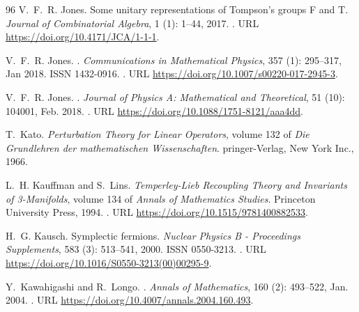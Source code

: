 \documentclass[a4paper, 11pt]{article}
\DeclareMathOperator{\1}{\mathds{1}}
\begin{document}
\begin{thebibliography}{96}
V.~F.~R. Jones.
\newblock Some unitary representations of {T}ompson's groups {F} and {T}.
\newblock \emph{Journal of Combinatorial Algebra}, 1 (1):
  1--44, 2017.
\newblock {}.
\newblock URL \url{https://doi.org/10.4171/JCA/1-1-1}.

V.~F.~R. Jones.
.
\newblock \emph{Communications in Mathematical Physics}, 357
  (1): 295--317, Jan 2018{}.
\newblock ISSN 1432-0916.
\newblock {}.
\newblock URL \url{https://doi.org/10.1007/s00220-017-2945-3}.

V.~F.~R. Jones.
.
\newblock \emph{Journal of Physics A: Mathematical and Theoretical},
  51 (10): 104001, Feb. 2018{}.
\newblock {}.
\newblock URL \url{https://doi.org/10.1088/1751-8121/aaa4dd}.

T.~{K}ato.
\newblock \emph{{P}erturbation {T}heory for {L}inear {O}perators}, volume 132
  of \emph{Die Grundlehren der mathematischen Wissenschaften}.
pringer-{V}erlag, {N}ew {Y}ork {I}nc., 1966.

L.~H. Kauffman and S.~Lins.
\newblock \emph{{Temperley-Lieb Recoupling Theory and Invariants of
  3-Manifolds}}, volume 134 of \emph{Annals of Mathematics Studies}.
\newblock Princeton University Press, 1994.
\newblock {}.
\newblock URL \url{https://doi.org/10.1515/9781400882533}.

H.~G. Kausch.
\newblock Symplectic fermions.
\newblock \emph{Nuclear Physics B - Proceedings Supplements}, 583
  (3): 513--541, 2000.
\newblock ISSN 0550-3213.
\newblock {}.
\newblock URL \url{https://doi.org/10.1016/S0550-3213(00)00295-9}.

Y.~Kawahigashi and R.~Longo.
.
\newblock \emph{Annals of Mathematics}, 160 (2): 493--522,
  Jan. 2004.
\newblock {}.
\newblock URL \url{https://doi.org/10.4007/annals.2004.160.493}.


\end{thebibliography}
\end{document}
